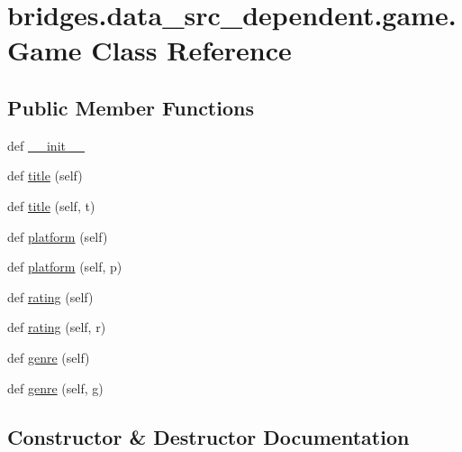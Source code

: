 \hypertarget{classbridges_1_1data__src__dependent_1_1game_1_1_game}{}\section{bridges.\+data\+\_\+src\+\_\+dependent.\+game.\+Game Class Reference}
\label{classbridges_1_1data__src__dependent_1_1game_1_1_game}
\subsection*{Public Member Functions}
\begin{DoxyCompactItemize}
\item 
def \hyperlink{classbridges_1_1data__src__dependent_1_1game_1_1_game_aeeaed2287f616f6ec9ff8c2bd6f07835}{\+\_\+\+\_\+init\+\_\+\+\_\+}
\item 
def \hyperlink{classbridges_1_1data__src__dependent_1_1game_1_1_game_a05838d85c567aa7ece895ca34ef2051b}{title} (self)
\item 
def \hyperlink{classbridges_1_1data__src__dependent_1_1game_1_1_game_ae2b0f2f1bbbf2d11c669079b075c6ad1}{title} (self, t)
\item 
def \hyperlink{classbridges_1_1data__src__dependent_1_1game_1_1_game_a6ded3cef2be4f19c8775f1b6c760d2d5}{platform} (self)
\item 
def \hyperlink{classbridges_1_1data__src__dependent_1_1game_1_1_game_ac7b692ca0b04271799d5bdd5117e3102}{platform} (self, p)
\item 
def \hyperlink{classbridges_1_1data__src__dependent_1_1game_1_1_game_a232bceb05cb6b595350deedb7091573b}{rating} (self)
\item 
def \hyperlink{classbridges_1_1data__src__dependent_1_1game_1_1_game_a132b50aaeb278283c91e71baafcd7510}{rating} (self, r)
\item 
def \hyperlink{classbridges_1_1data__src__dependent_1_1game_1_1_game_a280133072fb9bfd6c9ba3c30e3f04dd1}{genre} (self)
\item 
def \hyperlink{classbridges_1_1data__src__dependent_1_1game_1_1_game_a15a0bab4c77405c3825474228dddb470}{genre} (self, g)
\end{DoxyCompactItemize}


\subsection{Constructor \& Destructor Documentation}
\mbox{\label{classbridges_1_1data__src__dependent_1_1game_1_1_game_aeeaed2287f616f6ec9ff8c2bd6f07835}} 
